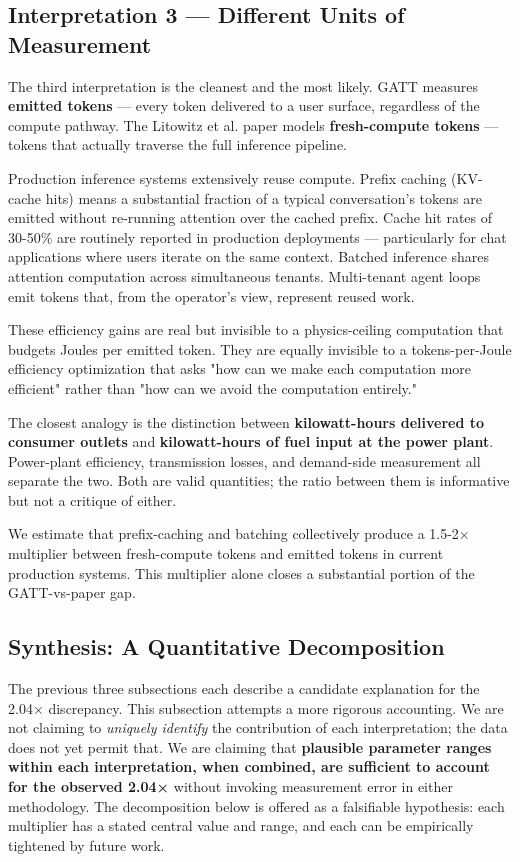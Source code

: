 \documentclass[11pt,a4paper]{article}
\begin{document}
\subsection{Interpretation 3 --- Different Units of Measurement}

The third interpretation is the cleanest and the most likely. GATT measures \textbf{emitted tokens} --- every token delivered to a user surface, regardless of the compute pathway. The Litowitz et al. paper models \textbf{fresh-compute tokens} --- tokens that actually traverse the full inference pipeline.

Production inference systems extensively reuse compute. Prefix caching (KV-cache hits) means a substantial fraction of a typical conversation's tokens are emitted without re-running attention over the cached prefix. Cache hit rates of 30-50\% are routinely reported in production deployments --- particularly for chat applications where users iterate on the same context. Batched inference shares attention computation across simultaneous tenants. Multi-tenant agent loops emit tokens that, from the operator's view, represent reused work.

These efficiency gains are real but invisible to a physics-ceiling computation that budgets Joules per emitted token. They are equally invisible to a tokens-per-Joule efficiency optimization that asks "how can we make each computation more efficient" rather than "how can we avoid the computation entirely."

The closest analogy is the distinction between \textbf{kilowatt-hours delivered to consumer outlets} and \textbf{kilowatt-hours of fuel input at the power plant}. Power-plant efficiency, transmission losses, and demand-side measurement all separate the two. Both are valid quantities; the ratio between them is informative but not a critique of either.

We estimate that prefix-caching and batching collectively produce a 1.5-2× multiplier between fresh-compute tokens and emitted tokens in current production systems. This multiplier alone closes a substantial portion of the GATT-vs-paper gap.

\subsection{Synthesis: A Quantitative Decomposition}

The previous three subsections each describe a candidate explanation for the 2.04× discrepancy. This subsection attempts a more rigorous accounting. We are not claiming to \emph{uniquely identify} the contribution of each interpretation; the data does not yet permit that. We are claiming that \textbf{plausible parameter ranges within each interpretation, when combined, are sufficient to account for the observed 2.04×} without invoking measurement error in either methodology. The decomposition below is offered as a falsifiable hypothesis: each multiplier has a stated central value and range, and each can be empirically tightened by future work.
\end{document}
